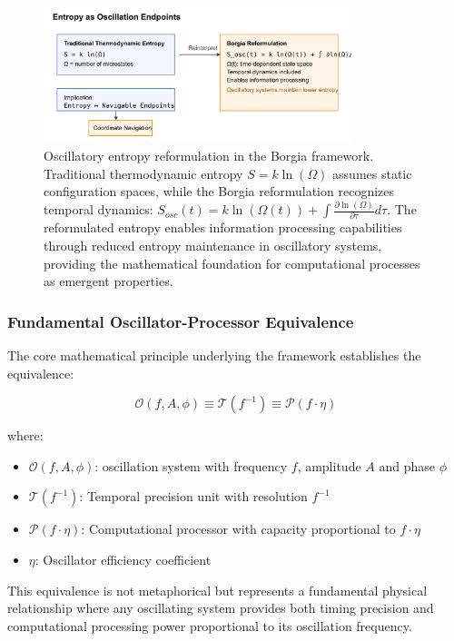 \documentclass[12pt,a4paper]{article}
\begin{document}
\begin{figure}[H]
    \centering
    \includegraphics[width=0.8\textwidth]{images/oscillatory_entropy_reformulation.pdf}
    \caption{Oscillatory entropy reformulation in the Borgia framework. Traditional thermodynamic entropy $S = k \ln(\Omega)$ assumes static configuration spaces, while the Borgia reformulation recognizes temporal dynamics: $S_{osc}(t) = k \ln(\Omega(t)) + \int \frac{\partial \ln(\Omega)}{\partial \tau} d\tau$. The reformulated entropy enables information processing capabilities through reduced entropy maintenance in oscillatory systems, providing the mathematical foundation for computational processes as emergent properties.}
    \label{fig:oscillatory_entropy}
    \end{figure}

\subsubsection{Fundamental Oscillator-Processor Equivalence}

The core mathematical principle underlying the framework establishes the equivalence:

\begin{equation}
\mathcal{O}(f, A, \phi) \equiv \mathcal{T}(f^{-1}) \equiv \mathcal{P}(f \cdot \eta)
\end{equation}

where:
\begin{itemize}
\item $\mathcal{O}(f, A, \phi)$: oscillation system with frequency $f$, amplitude $A$ and phase $\phi$
\item $\mathcal{T}(f^{-1})$: Temporal precision unit with resolution $f^{-1}$
\item $\mathcal{P}(f \cdot \eta)$: Computational processor with capacity proportional to $f \cdot \eta$
\item $\eta$: Oscillator efficiency coefficient
\end{itemize}

This equivalence is not metaphorical but represents a fundamental physical relationship where any oscillating system provides both timing precision and computational processing power proportional to its oscillation frequency.
\end{document}
